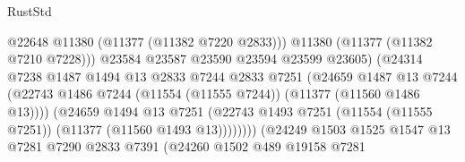 \begin{lexlean}{RustStd}
\begin{coremodule}
                                              @22648
                                              @11380
                                              (@11377 (@11382 @7220 @2833)))
                                            @11380
                                            (@11377 (@11382 @7210 @7228)))
                                          @23584
                                          @23587
                                          @23590
                                          @23594
                                          @23599
                                          @23605)
                                        (@24314
                                          @7238
                                          @1487
                                          @1494
                                          @13
                                          @2833
                                          @7244
                                          @2833
                                          @7251
                                          (@24659
                                            @1487
                                            @13
                                            @7244
                                            (@22743
                                              @1486
                                              @7244
                                              (@11554 (@11555 @7244))
                                              (@11377 (@11560 @1486 @13))))
                                          (@24659
                                            @1494
                                            @13
                                            @7251
                                            (@22743
                                              @1493
                                              @7251
                                              (@11554 (@11555 @7251))
                                              (@11377 (@11560 @1493 @13))))))))
                                  (@24249
                                    @1503
                                    @1525
                                    @1547
                                    @13
                                    @7281
                                    @7290
                                    @2833
                                    @7391
                                    (@24260
                                      @1502
                                      @489
                                      @19158
                                      @7281

\end{coremodule}
\end{lexlean}
